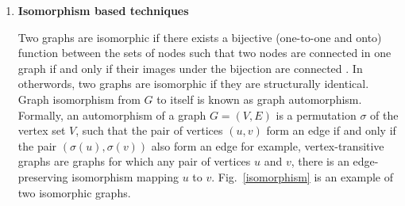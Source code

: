 \documentclass[10pt,a4paper]{article}
\theoremstyle{plain}
\theoremstyle{definition}
\begin{document}
     \begin{enumerate}
     	\item \textbf{Isomorphism based techniques}
     	
     	 Two graphs are isomorphic if there exists a bijective (one-to-one and onto) function between the sets of nodes
     	such that two nodes are connected in one graph if and only if their images under the bijection are connected \citep{zager2008graph}. In otherwords, two graphs are isomorphic if they are structurally identical. Graph isomorphism from $G$ to itself is known as graph automorphism. Formally, an automorphism of a graph $G = (V,E)$ is a permutation $\sigma$ of the vertex set $V$, such that the pair of vertices $(u,v)$ form an edge if and only if the pair $(\sigma(u),\sigma(v))$ also form an edge for example, vertex-transitive graphs are graphs for which any pair of vertices $u$ and $v$, there is an edge-preserving isomorphism mapping $u$ to $v$. Fig.~\ref{isomorphism} is an example of two isomorphic graphs.
     	

\end{enumerate}
\end{document}
